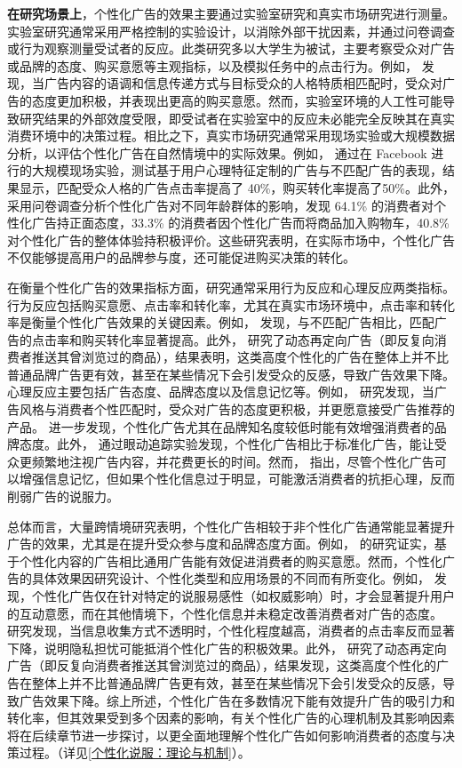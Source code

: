 \textbf{在研究场景上}，个性化广告的效果主要通过实验室研究和真实市场研究进行测量。实验室研究通常采用严格控制的实验设计，以消除外部干扰因素，并通过问卷调查或行为观察测量受试者的反应。此类研究多以大学生为被试，主要考察受众对广告或品牌的态度、购买意愿等主观指标，以及模拟任务中的点击行为。例如，\citet{hirsh2012personalized} 发现，当广告内容的语调和信息传递方式与目标受众的人格特质相匹配时，受众对广告的态度更加积极，并表现出更高的购买意愿。然而，实验室环境的人工性可能导致研究结果的外部效度受限，即受试者在实验室中的反应未必能完全反映其在真实消费环境中的决策过程。相比之下，真实市场研究通常采用现场实验或大规模数据分析，以评估个性化广告在自然情境中的实际效果。例如，\citet{matz2017psychological} 通过在 Facebook 进行的大规模现场实验，测试基于用户心理特征定制的广告与不匹配广告的表现，结果显示，匹配受众人格的广告点击率提高了 40\%，购买转化率提高了50\%。此外，\citet{bhavsar2024trending} 采用问卷调查分析个性化广告对不同年龄群体的影响，发现 64.1\% 的消费者对个性化广告持正面态度，33.3\% 的消费者因个性化广告而将商品加入购物车，40.8\% 对个性化广告的整体体验持积极评价。这些研究表明，在实际市场中，个性化广告不仅能够提高用户的品牌参与度，还可能促进购买决策的转化。

在衡量个性化广告的效果指标方面，研究通常采用行为反应和心理反应两类指标。行为反应包括购买意愿、点击率和转化率，尤其在真实市场环境中，点击率和转化率是衡量个性化广告效果的关键因素。例如，\citet{matz2017psychological} 发现，与不匹配广告相比，匹配广告的点击率和购买转化率显著提高。此外，\citet{lambrecht2013does} 研究了动态再定向广告（即反复向消费者推送其曾浏览过的商品），结果表明，这类高度个性化的广告在整体上并不比普通品牌广告更有效，甚至在某些情况下会引发受众的反感，导致广告效果下降。心理反应主要包括广告态度、品牌态度以及信息记忆等。例如，\citet{moon2002personalization} 研究发现，当广告风格与消费者个性匹配时，受众对广告的态度更积极，并更愿意接受广告推荐的产品。\citet{de2015me} 进一步发现，个性化广告尤其在品牌知名度较低时能有效增强消费者的品牌态度。此外，\citet{bang2016tracking} 通过眼动追踪实验发现，个性化广告相比于标准化广告，能让受众更频繁地注视广告内容，并花费更长的时间。然而，\citet{maslowska2016all} 指出，尽管个性化广告可以增强信息记忆，但如果个性化信息过于明显，可能激活消费者的抗拒心理，反而削弱广告的说服力。

总体而言，大量跨情境研究表明，个性化广告相较于非个性化广告通常能显著提升广告的效果，尤其是在提升受众参与度和品牌态度方面。例如，\citet{hirsh2012personalized} 的研究证实，基于个性化内容的广告相比通用广告能有效促进消费者的购买意愿。然而，个性化广告的具体效果因研究设计、个性化类型和应用场景的不同而有所变化。例如，\citet{winter2021effects} 发现，个性化广告仅在针对特定的说服易感性（如权威影响）时，才会显著提升用户的互动意愿，而在其他情境下，个性化信息并未稳定改善消费者对广告的态度。\citet{aguirre2015unraveling} 研究发现，当信息收集方式不透明时，个性化程度越高，消费者的点击率反而显著下降，说明隐私担忧可能抵消个性化广告的积极效果。此外，\citet{lambrecht2013does} 研究了动态再定向广告（即反复向消费者推送其曾浏览过的商品），结果发现，这类高度个性化的广告在整体上并不比普通品牌广告更有效，甚至在某些情况下会引发受众的反感，导致广告效果下降。综上所述，个性化广告在多数情况下能有效提升广告的吸引力和转化率，但其效果受到多个因素的影响，有关个性化广告的心理机制及其影响因素将在后续章节进一步探讨，以更全面地理解个性化广告如何影响消费者的态度与决策过程。（详见\ref{个性化说服：理论与机制}）。

